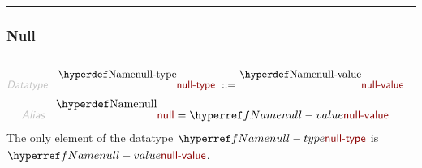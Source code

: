 

\begin{center}
\rule{3in}{0.4pt}
\end{center}

\subsubsection{Null}\hypertarget{null}{}\label{null}

\begin{align*}
  [ \
  \KEY{Datatype} \quad & \NAMEREF{null-type} \\
  \KEY{Funcon} \quad & \NAMEREF{null-value} \\
  \KEY{Alias} \quad & \NAMEREF{null}
  \ ]
\end{align*}
\begin{align*}
  \KEY{Datatype} \quad 
  \NAMEDECL{null-type} 
  \ ::= \ & \NAMEDECL{null-value}
\end{align*}
\begin{align*}
  \KEY{Alias} \quad
  & \NAMEDECL{null} = \NAMEREF{null-value}
\end{align*}
The only element of the datatype $\SHADE{\NAMEREF{null-type}}$ is $\SHADE{\NAMEREF{null-value}}$.



